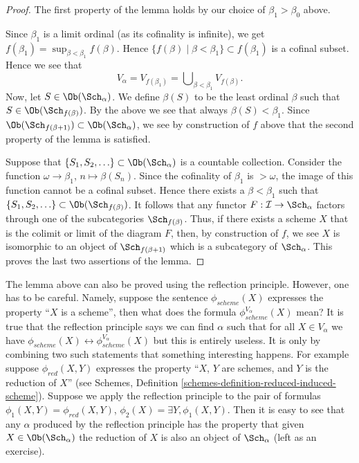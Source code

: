 \begin{proof}
\medskip\noindent
The first property of the lemma holds by our choice
of $\beta_1 > \beta_0$ above.

\medskip\noindent
Since $\beta_1$ is a limit ordinal (as its cofinality is infinite),
we get $f(\beta_1) = \sup_{\beta < \beta_1} f(\beta)$.
Hence $\{f(\beta) \mid \beta < \beta_1\} \subset f(\beta_1)$ is a
cofinal subset. Hence we see that
$$
V_\alpha = V_{f(\beta_1)} = \bigcup\nolimits_{\beta < \beta_1} V_{f(\beta)}.
$$
Now, let $S \in \Ob(\Sch_\alpha)$. We define
$\beta(S)$ to be the least ordinal $\beta$ such that
$S \in \Ob(\Sch_{f(\beta)})$. By the above we see
that always $\beta(S) < \beta_1$. Since
$\Ob(\Sch_{f(\beta + 1)}) \subset
\Ob(\Sch_\alpha)$, we
see by construction of $f$ above that the second property of the lemma
is satisfied.

\medskip\noindent
Suppose that $\{S_1, S_2, \ldots\} \subset \Ob(\Sch_\alpha)$
is a countable collection. Consider the function
$\omega \to \beta_1$, $n \mapsto \beta(S_n)$. Since the cofinality
of $\beta_1$ is $> \omega$, the image of this function cannot be a
cofinal subset. Hence there exists a $\beta < \beta_1$ such
that $\{S_1, S_2, \ldots\} \subset \Ob(\Sch_{f(\beta)})$.
It follows that any functor $F : \mathcal{I} \to \Sch_\alpha$
factors through one of the subcategories $\Sch_{f(\beta)}$.
Thus, if there exists a scheme $X$ that is the colimit or limit
of the diagram $F$, then, by construction of $f$, we see
$X$ is isomorphic to an object
of $\Sch_{f(\beta + 1)}$ which is a subcategory of
$\Sch_\alpha$. This proves the last two assertions of
the lemma.
\end{proof}

\begin{remark}
\label{remark-how-to-use-reflection}
The lemma above can also be proved using the reflection principle.
However, one has to be careful. Namely, suppose the sentence
$\phi_{scheme}(X)$ expresses the property ``$X$ is a scheme'', then
what does the formula $\phi_{scheme}^{V_\alpha}(X)$ mean?
It is true that the reflection principle says we can find $\alpha$ such that
for all $X \in V_\alpha$ we have
$\phi_{scheme}(X) \leftrightarrow \phi_{scheme}^{V_\alpha}(X)$
but this is entirely useless. It is only by combining two such
statements that something interesting happens. For example suppose
$\phi_{red}(X, Y)$ expresses the property ``$X$, $Y$ are schemes,
and $Y$ is the reduction of $X$'' (see
Schemes, Definition \ref{schemes-definition-reduced-induced-scheme}).
Suppose we apply the reflection principle to the pair of
formulas $\phi_1(X, Y) = \phi_{red}(X, Y)$,
$\phi_2(X) = \exists Y, \phi_1(X, Y)$. Then it is easy to see that
any $\alpha$ produced by the reflection principle has the property that
given $X \in \Ob(\Sch_\alpha)$ the reduction of
$X$ is also an object of $\Sch_\alpha$ (left as an exercise).
\end{remark}

